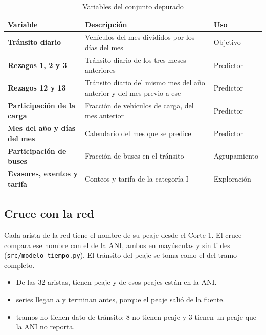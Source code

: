 \documentclass[12pt,a4paper]{article}
\begin{document}
\begin{table}[H]
\centering
\caption{Variables del conjunto depurado}
\label{tab:variables}
\small
\renewcommand{\arraystretch}{1.2}
\begin{tabular}{|l|>{\raggedright\arraybackslash}p{6.2cm}|l|}
\hline
\rowcolor{gray!20} \textbf{Variable} & \textbf{Descripción} & \textbf{Uso} \\
\hline
\textbf{Tránsito diario} & Vehículos del mes divididos por los días del mes & Objetivo \\
\hline
\textbf{Rezagos 1, 2 y 3} & Tránsito diario de los tres meses anteriores & Predictor \\
\hline
\textbf{Rezagos 12 y 13} & Tránsito diario del mismo mes del año anterior y del mes previo a ese & Predictor \\
\hline
\textbf{Participación de la carga} & Fracción de vehículos de carga, del mes anterior & Predictor \\
\hline
\textbf{Mes del año y días del mes} & Calendario del mes que se predice & Predictor \\
\hline
\textbf{Participación de buses} & Fracción de buses en el tránsito & Agrupamiento \\
\hline
\textbf{Evasores, exentos y tarifa} & Conteos y tarifa de la categoría I & Exploración \\
\hline
\end{tabular}
\end{table}

\subsection{Cruce con la red}

Cada arista de la red tiene el nombre de su peaje desde el Corte 1. El cruce
compara ese nombre con el de la ANI, ambos en mayúsculas y sin tildes
(\texttt{src/modelo\_tiempo.py}). El tránsito del peaje se toma como el del
tramo completo.

\begin{itemize}
\item De las 32 aristas, \ctTramosConPeaje{} tienen peaje y
\ctTramosConSerie{} de esos peajes están en la ANI.
\item \ctTramosVigentes{} series llegan a \ctUltimoMes{} y
\ctTramosHistoricos{} terminan antes, porque el peaje salió de la fuente.
\item \ctTramosSinDato{} tramos no tienen dato de tránsito: 8 no tienen peaje
y 3 tienen un peaje que la ANI no reporta.
\end{itemize}
\end{document}
